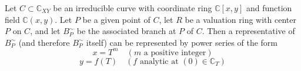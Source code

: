 Let $C \subset \mathbb{C}_{XY}$ be an irreducible curve with coordinate ring $\mathbb{C}[x, y]$ and function field $\mathbb{C}(x, y)$. Let $P$ be a given point of $C$, let $R$ be a valuation ring with center $P$ on $C$, and let $B_P^\sim$ be the associated branch at $P$ of $C$. Then a representative of $B_P^\sim$ (and therefore $B_P^\sim$ itself) can be represented by power series of the form
$$x = T^m \quad (m \text{ a positive integer})$$
$$y = f(T) \quad (f \text{ analytic at } (0) \in \mathbb{C}_T)$$
